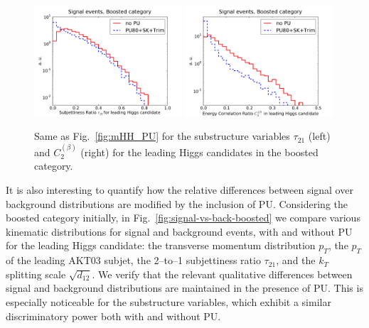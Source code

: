 \begin{figure}[t]
  \begin{center}
    \includegraphics[width=0.49\textwidth]{plots/tau21_h0_bst_comp.pdf}
  \includegraphics[width=0.49\textwidth]{plots/D2_h0_bst_comp.pdf}
    \caption{\small
    Same as Fig.~\ref{fig:mHH_PU} for the
    substructure variables $\tau_{21}$  (left)
     and  $C_2^{(\beta)}$ (right)
     for the leading Higgs candidates in the boosted category.
}
\label{fig:Substructure_PU}
\end{center}
\end{figure}

It is also interesting to quantify how
the relative differences between
signal over background distributions are modified by the inclusion of PU.
%
Considering the boosted category initially,
in Fig.~\ref{fig:signal-vs-back-boosted} we compare
various kinematic distributions for signal and background events,
with and without PU for the leading Higgs candidate: the transverse
momentum distribution $p_T$,
the $p_T$ of the leading AKT03 subjet,
     the 2--to--1 subjettiness ratio $\tau_{21}$, and 
     the $k_T$ splitting scale $\sqrt{d_{12}}$.
      We verify that the relevant
      qualitative differences between signal
      and background distributions are maintained  in the presence of PU.
      This is especially noticeable for the substructure variables, which
      exhibit a similar discriminatory power both with and without
      PU.
     


